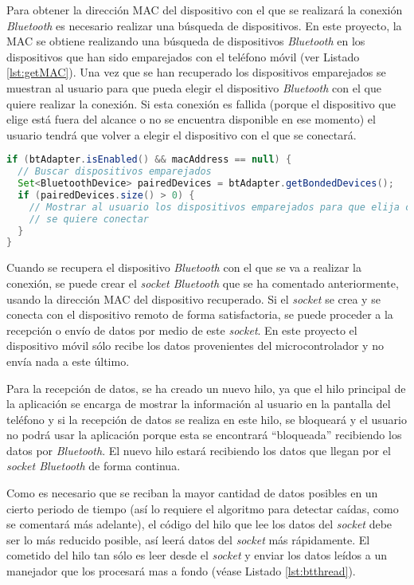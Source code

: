 Para obtener la dirección \ac{MAC} del dispositivo con el que se realizará la conexión \textit{Bluetooth} es necesario realizar una búsqueda de dispositivos. En este proyecto, la \ac{MAC} se obtiene realizando una búsqueda de dispositivos \textit{Bluetooth} en los dispositivos que han sido emparejados con el teléfono móvil (ver Listado \ref{lst:getMAC}). Una vez que se han recuperado los dispositivos emparejados se muestran al usuario para que pueda elegir el dispositivo \textit{Bluetooth} con el que quiere realizar la conexión. Si esta conexión es fallida (porque el dispositivo que elige está fuera del alcance o no se encuentra disponible en ese momento) el usuario tendrá que volver a elegir el dispositivo con el que se conectará.

\begin{lstlisting}[language=java,captionpos=t,caption={\textbf{Búsqueda de dispositivos \textit{Bluetooth} emparejados para obtener la dirección \ac{MAC}.}},label={lst:getMAC}]
if (btAdapter.isEnabled() && macAddress == null) {
  // Buscar dispositivos emparejados
  Set<BluetoothDevice> pairedDevices = btAdapter.getBondedDevices();
  if (pairedDevices.size() > 0) {
    // Mostrar al usuario los dispositivos emparejados para que elija con el que 
    // se quiere conectar  
  }
}
\end{lstlisting}

Cuando se recupera el dispositivo \textit{Bluetooth} con el que se va a realizar la conexión, se puede crear el \textit{socket Bluetooth} que se ha comentado anteriormente, usando la dirección \ac{MAC} del dispositivo recuperado. Si el \textit{socket} se crea y se conecta con el dispositivo remoto de forma satisfactoria, se puede proceder a la recepción o envío de datos por medio de este \textit{socket}. En este proyecto el dispositivo móvil sólo recibe los datos provenientes del microcontrolador y no envía nada a este último. 

Para la recepción de datos, se ha creado un nuevo hilo, ya que el hilo principal de la aplicación se encarga de mostrar la información al usuario en la pantalla del teléfono y si la recepción de datos se realiza en este hilo, se bloqueará y el usuario no podrá usar la aplicación porque esta se encontrará ``bloqueada'' recibiendo los datos por \textit{Bluetooth}. El nuevo hilo estará recibiendo los datos que llegan por el \textit{socket Bluetooth} de forma continua.

Como es necesario que se reciban la mayor cantidad de datos posibles en un cierto periodo de tiempo (así lo requiere el algoritmo para detectar caídas, como se comentará más adelante), el código del hilo que lee los datos del \textit{socket} debe ser lo más reducido posible, así leerá datos del \textit{socket} más rápidamente. El cometido del hilo tan sólo es leer desde el \textit{socket} y enviar los datos leídos a un manejador que los procesará mas a fondo (véase Listado \ref{lst:btthread}).

